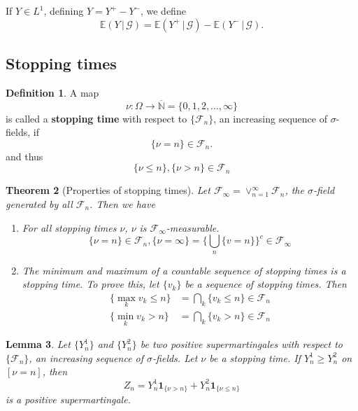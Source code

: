 \documentclass[10pt, oneside, reqno]{amsart}
\theoremstyle{plain}%
\newtheorem{thm}{Theorem}[section]
\newtheorem{lem}[thm]{Lemma}
\theoremstyle{definition}
\newtheorem{defn}[thm]{Definition}
\theoremstyle{remark}
\newcommand{\given}{ \, | \,}
\newcommand{\sigf}{\mathcal{F}}
\newcommand{\E}{\mathbb{E}}
\newcommand{\N}{\mathbb{N}}
\newcommand{\sigg}{\mathcal{G}}
\newcommand{\indic}[1]{\mathbf{1}_{\{ #1 \}} }
\begin{document}
If $Y \in L^1$, defining $Y = Y^+ - Y^-$, we define \[
	\E(Y \given \sigg) = \E(Y^+ \given \sigg) - \E(Y^- \given \sigg).  
\]

\subsection{Stopping times} %
\label{sub:stopping_times}

\begin{defn}
	A map \[
		\nu : \Omega \rightarrow \overline{\N} = \{ 0, 1, 2, \dots, \infty \}
	\] is called a \textbf{stopping time} with respect to $\{ \sigf_n \}$, an increasing sequence of $\sigma$-fields, if \[
		\{ \nu = n \} \in \sigf_n.
	\] and thus \[
		\{ \nu \leq n \}, \{ \nu > n \} \in \sigf_n
	\]
\end{defn}

\begin{thm}[Properties of stopping times]
	Let $\sigf_\infty = \vee_{n=1}^\infty \sigf_n$, the $\sigma$-field generated by all $\sigf_n$.   Then we have 
	\begin{enumerate}[(1)]
		\item For all stopping times $\nu$, $\nu$ is $\sigf_\infty$-measurable.\[
			\{ \nu = n \} \in \sigf_n, \{ \nu = \infty \} = \{ \bigcup_{n} \{ v = n \} \}^c \in \sigf_\infty
		\]
		\item The minimum and maximum of a countable sequence of stopping times is a stopping time.  To prove this, let $\{ v_k\}$ be a sequence of stopping times.  Then \begin{align*}
		\{ \max_{k} v_k \leq n \} &= \bigcap_k \{ v_k \leq n \} \in \sigf_n	\\
		\{ \min_{k} v_k > n \} &= \bigcap_k \{ v_k > n \} \in \sigf_n							
		\end{align*}
	\end{enumerate}	
\end{thm}

\begin{lem}
	Let $\{ Y_n^1 \}$ and $\{ Y_n^2 \}$ be two positive supermartingales with respect to $\{ \sigf_n \}$, an increasing sequence of $\sigma$-fields.  Let $\nu$ be a stopping time.  If $Y_n^1 \geq Y_n^2$ on $[\nu = n]$, then \[
		Z_n = Y_n^1 \indic{\nu > n} + Y_n^2 \indic{\nu \leq n}
	\] is a positive supermartingale.  
\end{lem}
\end{document}
